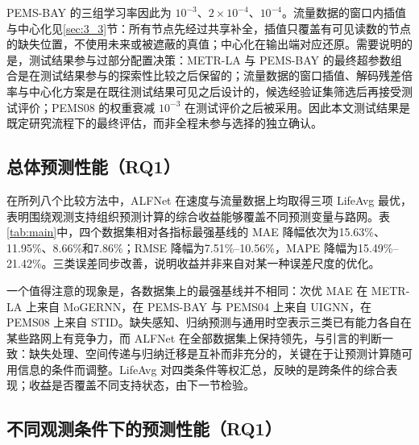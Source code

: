 \begin{center}
\small
\resizebox{\linewidth}{!}{}
\end{center}

PEMS-BAY 的三组学习率因此为 $10^{-3}$、$2\times10^{-4}$、$10^{-4}$。流量数据的窗口内插值与中心化见\ref{sec:3_3}节：所有节点先经过共享补全，插值只覆盖有可见读数的节点的缺失位置，不使用未来或被遮蔽的真值；中心化在输出端对应还原。需要说明的是，测试结果参与过部分配置决策：METR-LA 与 PEMS-BAY 的最终超参数组合是在测试结果参与的探索性比较之后保留的；流量数据的窗口插值、解码残差倍率与中心化方案是在既往测试结果可见之后设计的，候选经验证集筛选后再接受测试评价；PEMS08 的权重衰减 $10^{-3}$ 在测试评价之后被采用。因此本文测试结果是既定研究流程下的最终评估，而非全程未参与选择的独立确认。

\subsection{总体预测性能（RQ1）}\label{sec:4_2}

在所列八个比较方法中，ALFNet 在速度与流量数据上均取得三项 LifeAvg 最优，表明围绕观测支持组织预测计算的综合收益能够覆盖不同预测变量与路网。表\ref{tab:main}中，四个数据集相对各指标最强基线的 MAE 降幅依次为15.63\%、11.95\%、8.66\%和7.86\%；RMSE 降幅为7.51\%–10.56\%，MAPE 降幅为15.49\%–21.42\%。三类误差同步改善，说明收益并非来自对某一种误差尺度的优化。

\begin{table}[t]
\caption{\textbf{四个数据集的总体预测性能（测试集 LifeAvg）。}最优加粗，次优加下划线，排名与正文降幅均按未舍入值计算；各数据集独立比较，速度与流量的绝对误差不可横向比较。}
\label{tab:main}
\centering
\small
\setlength{\tabcolsep}{3pt}
\resizebox{\linewidth}{!}{}
\end{table}

一个值得注意的现象是，各数据集上的最强基线并不相同：次优 MAE 在 METR-LA 上来自 MoGERNN，在 PEMS-BAY 与 PEMS04 上来自 UIGNN，在 PEMS08 上来自 STID。缺失感知、归纳预测与通用时空表示三类已有能力各自在某些路网上有竞争力，而 ALFNet 在全部数据集上保持领先，与引言的判断一致：缺失处理、空间传递与归纳迁移是互补而非充分的，关键在于让预测计算随可用信息的条件而调整。LifeAvg 对四类条件等权汇总，反映的是跨条件的综合表现；收益是否覆盖不同支持状态，由下一节检验。

\subsection{不同观测条件下的预测性能（RQ1）}\label{sec:4_3}

